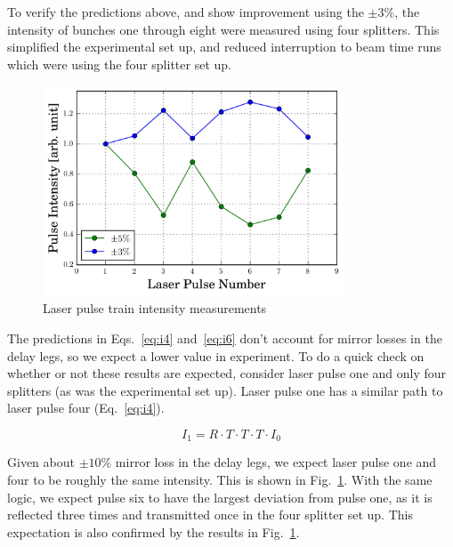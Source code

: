\documentclass{iitthesis}
\begin{document}
To verify the predictions above, and show improvement using the $\pm3\%$,
the intensity of bunches one through eight were measured using four splitters. 
This simplified the experimental set up, and reduced interruption to beam time 
runs which were using the four splitter
set up.  
\begin{figure}[h]
	\begin{center}
		\includegraphics[width=0.8\textwidth]{images/splitter_improvement}\caption{Laser pulse train intensity measurements}
	\end{center}
	\label{fig:origtrain}
\end{figure}
The predictions in Eqs.~\ref{eq:i4} and~\ref{eq:i6} don't account for mirror losses in the delay legs, 
so we expect a lower value in experiment. To do a quick check on whether or not these results are 
expected, consider laser pulse one and only four splitters (as was the experimental set up). 
Laser pulse one has a similar path to laser pulse four (Eq.~\ref{eq:i4}). 

\begin{equation}
	I_1 = R \cdot T \cdot T \cdot T \cdot I_0 
\end{equation}

Given about $\pm10\%$ mirror loss in the delay legs, we expect laser pulse one and four 
to be roughly the same intensity. This is shown in Fig.~\ref{fig:origtrain}. With the same 
logic, we expect pulse six to have the largest deviation from pulse one, as it is reflected 
three times and transmitted once in the four splitter set up. This expectation is also 
confirmed by the results in Fig.~\ref{fig:origtrain}.


\end{document}
